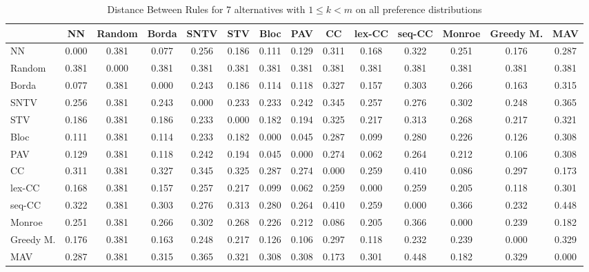 
\begin{table*}
\centering
\begin{tabular}{lccccccccccccc}
\toprule
 & NN & Random & Borda & SNTV & STV & Bloc & PAV & CC & lex-CC & seq-CC & Monroe & Greedy M. & MAV \\
\midrule
NN & 0.000 & 0.381 & 0.077 & 0.256 & 0.186 & 0.111 & 0.129 & 0.311 & 0.168 & 0.322 & 0.251 & 0.176 & 0.287 \\
Random & 0.381 & 0.000 & 0.381 & 0.381 & 0.381 & 0.381 & 0.381 & 0.381 & 0.381 & 0.381 & 0.381 & 0.381 & 0.381 \\
Borda & 0.077 & 0.381 & 0.000 & 0.243 & 0.186 & 0.114 & 0.118 & 0.327 & 0.157 & 0.303 & 0.266 & 0.163 & 0.315 \\
SNTV & 0.256 & 0.381 & 0.243 & 0.000 & 0.233 & 0.233 & 0.242 & 0.345 & 0.257 & 0.276 & 0.302 & 0.248 & 0.365 \\
STV & 0.186 & 0.381 & 0.186 & 0.233 & 0.000 & 0.182 & 0.194 & 0.325 & 0.217 & 0.313 & 0.268 & 0.217 & 0.321 \\
Bloc & 0.111 & 0.381 & 0.114 & 0.233 & 0.182 & 0.000 & 0.045 & 0.287 & 0.099 & 0.280 & 0.226 & 0.126 & 0.308 \\
PAV & 0.129 & 0.381 & 0.118 & 0.242 & 0.194 & 0.045 & 0.000 & 0.274 & 0.062 & 0.264 & 0.212 & 0.106 & 0.308 \\
CC & 0.311 & 0.381 & 0.327 & 0.345 & 0.325 & 0.287 & 0.274 & 0.000 & 0.259 & 0.410 & 0.086 & 0.297 & 0.173 \\
lex-CC & 0.168 & 0.381 & 0.157 & 0.257 & 0.217 & 0.099 & 0.062 & 0.259 & 0.000 & 0.259 & 0.205 & 0.118 & 0.301 \\
seq-CC & 0.322 & 0.381 & 0.303 & 0.276 & 0.313 & 0.280 & 0.264 & 0.410 & 0.259 & 0.000 & 0.366 & 0.232 & 0.448 \\
Monroe & 0.251 & 0.381 & 0.266 & 0.302 & 0.268 & 0.226 & 0.212 & 0.086 & 0.205 & 0.366 & 0.000 & 0.239 & 0.182 \\
Greedy M. & 0.176 & 0.381 & 0.163 & 0.248 & 0.217 & 0.126 & 0.106 & 0.297 & 0.118 & 0.232 & 0.239 & 0.000 & 0.329 \\
MAV & 0.287 & 0.381 & 0.315 & 0.365 & 0.321 & 0.308 & 0.308 & 0.173 & 0.301 & 0.448 & 0.182 & 0.329 & 0.000 \\
\bottomrule
\end{tabular}

\caption{Distance Between Rules for 7 alternatives with $1 \leq k < m$ on all preference distributions}
\end{table*}
